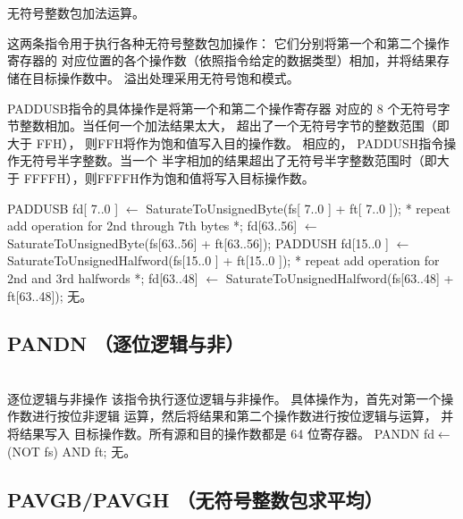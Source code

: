\begin{instructionblk}
   \\
   \\
  {无符号整数包加法运算。}
  {这两条指令用于执行各种无符号整数包加操作： 它们分别将第一个和第二个操作寄存器的
  对应位置的各个操作数（依照指令给定的数据类型）相加，并将结果存储在目标操作数中。
  溢出处理采用无符号饱和模式。

  PADDUSB指令的具体操作是将第一个和第二个操作寄存器
  对应的 8 个无符号字节整数相加。当任何一个加法结果太大，
  超出了一个无符号字节的整数范围（即大于 FFH），
  则FFH将作为饱和值写入目的操作数。
  相应的， PADDUSH指令操作无符号半字整数。当一个
  半字相加的结果超出了无符号半字整数范围时（即大于
  FFFFH），则FFFFH作为饱和值将写入目标操作数。}
  {PADDUSB \narrownewline
  fd[ 7..0 ]  $\leftarrow$ SaturateToUnsignedByte(fs[ 7..0 ] + ft[ 7..0 ]); \narrownewline
  * repeat add operation for 2nd through 7th bytes *; \narrownewline
  fd[63..56] $\leftarrow$ SaturateToUnsignedByte(fs[63..56] + ft[63..56]); \narrownewline \narrownewline
  PADDUSH \narrownewline
  fd[15..0 ] $\leftarrow$ SaturateToUnsignedHalfword(fs[15..0 ] + ft[15..0 ]); \narrownewline
  * repeat add operation for 2nd and 3rd halfwords *; \narrownewline
  fd[63..48] $\leftarrow$ SaturateToUnsignedHalfword(fs[63..48] + ft[63..48]);}
  {无。}
\end{instructionblk}

\subsection{PANDN （逐位逻辑与非）}

\begin{instructionblk}
   \\
  {逐位逻辑与非操作}
  {该指令执行逐位逻辑与非操作。 具体操作为，首先对第一个操作数进行按位非逻辑
  运算，然后将结果和第二个操作数进行按位逻辑与运算， 并将结果写入
  目标操作数。所有源和目的操作数都是 64 位寄存器。}
  {PANDN \narrownewline
  fd$\leftarrow$(NOT fs) AND ft;}
  {无。}
\end{instructionblk}

\subsection{PAVGB/PAVGH （无符号整数包求平均）}

